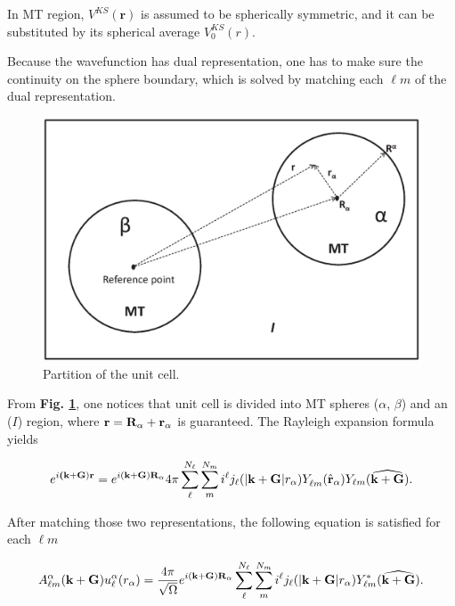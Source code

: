\documentclass[a4paper, 12pt, titlepage,oneside,drop]{kthesis}
\begin{document}
In MT region, $V^{KS}(\textbf{r})$ is assumed to be spherically symmetric, and it can be substituted by its spherical average $V^{KS}_0({r})$.

Because the wavefunction has dual representation, one has to make sure the continuity on the sphere boundary, which is solved by matching each $\ell m$
of the dual representation.

\begin{figure}[h]
\begin{center}
\includegraphics[scale=0.5]{unitcell.eps}
\caption{Partition of the unit cell.}
\label{ucuc}
\end{center}
\end{figure}

From \textbf{Fig. \ref{ucuc}}, one notices that unit cell is divided into MT spheres ($\alpha$, $\beta$) and an
($I$) region, where ${\textbf r = {\textbf R_{\alpha}}+{\textbf r_{\alpha}}}$ is guaranteed. The Rayleigh expansion formula yields

\begin{equation}
\expg<(\textbf {k}+\textbf{G})> = e^{i (\textbf {k}+\textbf{G}) \textbf{R}_{\alpha} } 4 \pi \sum\limits_{{\ell}}^{N_{\ell}} \sum\limits_{{m}}^{N_{m}} i^{\ell} \bessf< |\textbf{k}+\textbf{G}|> \sphfr<\ell{m}><r><> Y_{\ell{m}}(\widehat{\textbf{k}+\textbf{G}}).
\end{equation}
  
After matching those two representations, the following equation is satisfied for each ${\ell}m$

\begin{equation}
A _{{\ell}m}^{\alpha} (\textbf {k}+\textbf{G})  u_{{\ell}}^{\alpha}(r_{\alpha})=  \frac{4 \pi }{\sqrt{\Omega}} e^{i (\textbf {k}+\textbf{G}) \textbf{R}_{\alpha} }  \sum\limits_{{\ell}}^{N_{\ell}} \sum\limits_{{m}}^{N_{m}} i^{\ell} \bessf< |\textbf{k}+\textbf{G}|> Y^{*}_{\ell{m}}(\widehat{\textbf{k}+\textbf{G}}).
\end{equation}
\end{document}
